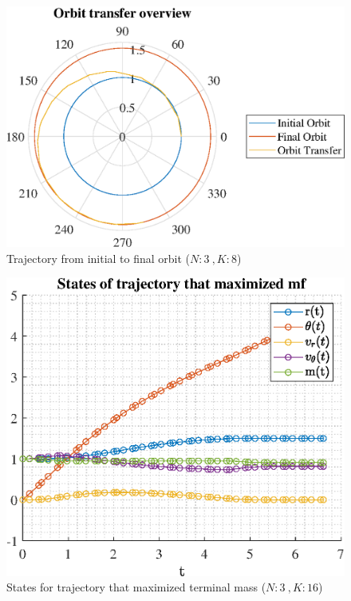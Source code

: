 \documentclass[]{article}
\begin{document}
	\begin{figure}
		\centering
		\includegraphics[scale=0.75]{orbit_N3_K8_C2_mf.eps}
		\caption{Trajectory from initial to final orbit (\(N:3\ , K:8\))}
		\label{fig:orbit_N3_K8_C2_mf}
	\end{figure}
	\begin{figure}
		\centering
		\includegraphics[scale=0.75]{states_N3_K16_C2_mf.eps}
		\caption{States for trajectory that maximized terminal mass (\(N:3\ , K:16\))}
		\label{fig:states_N3_K16_C2_mf}
	\end{figure}
\end{document}
